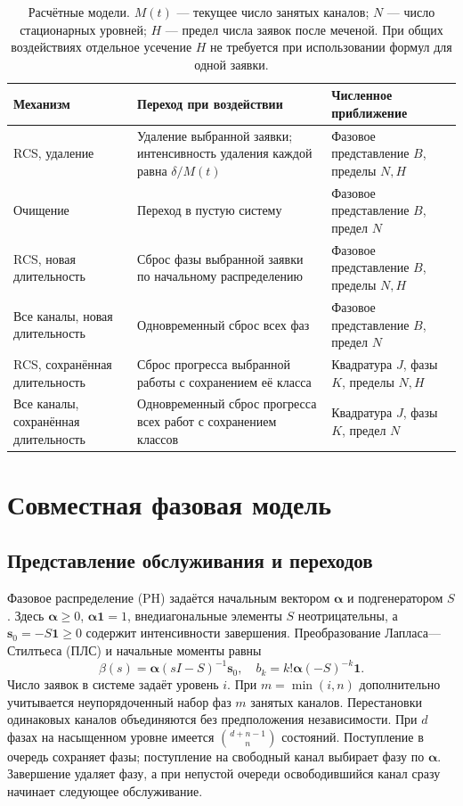 \documentclass[a4paper,12pt]{article}
\begin{document}
\begin{table}[!htbp]
\centering\small
\begin{tabular}{@{}p{3.6cm}p{6.0cm}p{5.0cm}@{}}
\toprule
Механизм & Переход при воздействии & Численное приближение \\
\midrule
RCS, удаление & Удаление выбранной заявки; интенсивность удаления каждой равна \(\delta/M(t)\) & Фазовое представление \(B\), пределы \(N,H\) \\
Очищение & Переход в пустую систему & Фазовое представление \(B\), предел \(N\) \\
RCS, новая длительность & Сброс фазы выбранной заявки по начальному распределению & Фазовое представление \(B\), пределы \(N,H\) \\
Все каналы, новая длительность & Одновременный сброс всех фаз & Фазовое представление \(B\), предел \(N\) \\
RCS, сохранённая длительность & Сброс прогресса выбранной работы с сохранением её класса & Квадратура \(J\), фазы \(K\), пределы \(N,H\) \\
Все каналы, сохранённая длительность & Одновременный сброс прогресса всех работ с сохранением классов & Квадратура \(J\), фазы \(K\), предел \(N\) \\
\bottomrule
\end{tabular}
\caption{Расчётные модели. \(M(t)\) --- текущее число занятых каналов; \(N\) --- число стационарных уровней; \(H\) --- предел числа заявок после меченой. При общих воздействиях отдельное усечение \(H\) не требуется при использовании формул для одной заявки.}
\label{tab:methods}
\end{table}

\section{Совместная фазовая модель}
\subsection{Представление обслуживания и переходов}
Фазовое распределение (PH) задаётся начальным вектором \(\boldsymbol\alpha\) и подгенератором \(S\). Здесь \(\boldsymbol\alpha\ge0\), \(\boldsymbol\alpha\mathbf1=1\), внедиагональные элементы \(S\) неотрицательны, а \(\boldsymbol s_0=-S\mathbf1\ge0\) содержит интенсивности завершения. Преобразование Лапласа—Стилтьеса (ПЛС) и начальные моменты равны
\[
\beta(s)=\boldsymbol\alpha(sI-S)^{-1}\boldsymbol s_0,\quad
b_k=k!\boldsymbol\alpha(-S)^{-k}\mathbf1.
\]
Число заявок в системе задаёт уровень \(i\). При \(m=\min(i,n)\) дополнительно учитывается неупорядоченный набор фаз \(m\) занятых каналов. Перестановки одинаковых каналов объединяются без предположения независимости. При \(d\) фазах на насыщенном уровне имеется \(\binom{d+n-1}{n}\) состояний. Поступление в очередь сохраняет фазы; поступление на свободный канал выбирает фазу по \(\boldsymbol\alpha\). Завершение удаляет фазу, а при непустой очереди освободившийся канал сразу начинает следующее обслуживание.
\end{document}
